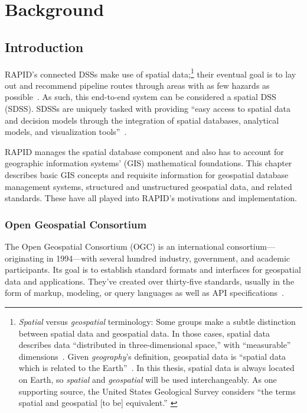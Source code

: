 \chapter{Background}
\label{background}

\section{Introduction}
\label{background_intro}
RAPID's connected DSSs make use of spatial data;\footnote{\textit{Spatial} versus \textit{geospatial} terminology: Some groups make a subtle distinction between spatial data and geospatial data. In those cases, spatial data describes data ``distributed in three-dimensional space,'' with ``measurable'' dimensions~\cite{Bhatta2011}. Given \textit{geography}'s definition, geospatial data is ``spatial data which is related to the Earth''~\cite{Bhatta2011}. In this thesis, spatial data is always located on Earth, so \textit{spatial} and \textit{geospatial} will be used interchangeably. As one supporting source, the United States Geological Survey considers ``the terms spatial and geospatial [to be] equivalent.''
\cite{Bhatta2011}} their eventual goal is to lay out and recommend pipeline routes through areas with as few hazards as possible~\cite{Dunning2013}. As such, this end-to-end system can be considered a spatial DSS (SDSS). SDSSs are uniquely tasked with providing ``easy access to spatial data and decision models through the integration of spatial databases, analytical models, and visualization tools''~\cite{RedlandsSDSS}.

RAPID manages the spatial database component and also has to account for geographic information systems' (GIS) mathematical foundations. This chapter describes basic GIS concepts and requisite information for geospatial database management systems, structured and unstructured geospatial data, and related standards. These have all played into RAPID's motivations and implementation.

\subsection{Open Geospatial Consortium}
The Open Geospatial Consortium (OGC) is an international consortium---originating in 1994---with several hundred industry, government, and academic participants. Its goal is to establish standard formats and interfaces for geospatial data and applications. They've created over thirty-five standards, usually in the form of markup, modeling, or query languages as well as API specifications~\cite{ogc}.

